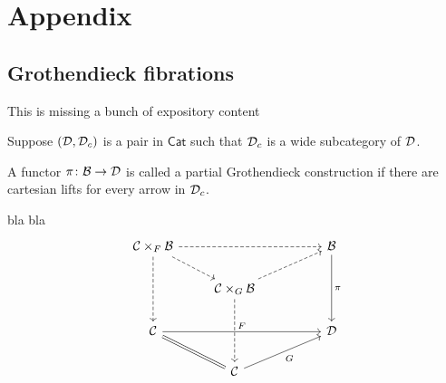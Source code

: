 \documentclass[a4paper,10pt]{article}%
\begin{document}
\section{Appendix}

\subsection{Grothendieck fibrations}

{\color{red} This is missing a bunch of expository content}


\begin{definition}
Suppose $(\mathcal{D},\mathcal{D}_c)$ is a pair in $\mathsf{Cat}$ such that $\mathcal{D}_c$ is a wide subcategory of $\mathcal{D}$.

A functor $\pi \colon \mathcal{B} \to \mathcal{D}$
is called a partial Grothendieck construction if there are cartesian lifts for every arrow in $\mathcal{D}_c$.
\end{definition}

\begin{lemma}
bla bla
\[
\begin{tikzcd}
	\mathcal{C} \times_F \mathcal{B} \ar[dashed]{rrr} \ar[dashed]{dd} \ar[dashed]{rd} & & & \mathcal{B} \ar{dd}{\pi}
\\
	& \mathcal{C} \times_G \mathcal{B} \ar[dashed]{rru} \ar[dashed]{dd}
\\
	\mathcal{C} \ar{rrr}{F} \ar[equal]{rd} & & & \mathcal{D}
\\
	& \mathcal{C} \ar{rru}[swap]{G}
\end{tikzcd}
\]
\end{lemma}


{}




\end{document}
